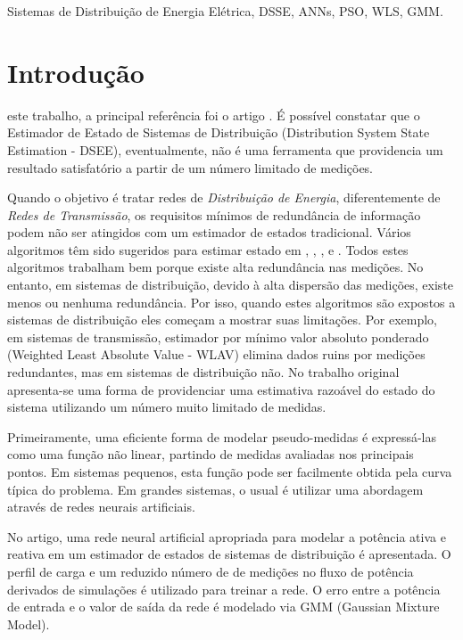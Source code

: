 \documentclass{IEEEtran}
\begin{document}
\begin{IEEEkeywords}
Sistemas de Distribuição de Energia Elétrica, DSSE, ANNs, PSO, WLS, GMM.
\end{IEEEkeywords}

\IEEEpeerreviewmaketitle

\section{Introdução}
 este trabalho, a principal referência foi o artigo \cite{manitsas2012distribution}. É possível constatar que o Estimador de Estado de Sistemas de Distribuição (Distribution System State Estimation - DSEE), eventualmente, não é uma ferramenta que providencia um resultado satisfatório a partir de um número limitado de medições. 

Quando o objetivo é tratar redes de \textit{Distribuição de Energia}, diferentemente de \textit{Redes de Transmissão}, os requisitos mínimos de redundância de informação podem não ser atingidos com um estimador de estados tradicional. Vários algoritmos têm sido sugeridos para estimar estado em \cite{schweppe1970powerI}, \cite{schweppe1970powerII}, \cite{schweppe1970powerIII}, \cite{abur2004power} e \cite{monticelli2000electric}. Todos estes algoritmos trabalham bem porque existe alta redundância nas medições. No entanto, em sistemas de distribuição, devido à alta dispersão das medições, existe menos ou nenhuma redundância. Por isso, quando estes algoritmos são expostos a sistemas de distribuição eles começam a mostrar suas limitações. Por exemplo, em sistemas de transmissão, estimador por mínimo valor absoluto ponderado (Weighted Least Absolute Value - WLAV) elimina dados ruins por medições redundantes, mas em sistemas de distribuição não. No trabalho original apresenta-se uma forma de providenciar uma estimativa razoável do estado do sistema utilizando um número muito limitado de medidas.

Primeiramente, uma eficiente forma de modelar pseudo-medidas é expressá-las como uma função não linear, partindo de medidas avaliadas nos principais pontos. Em sistemas pequenos, esta função pode  ser facilmente obtida pela curva típica do problema. Em grandes sistemas, o usual é utilizar uma abordagem através de redes neurais artificiais.

No artigo, uma rede neural artificial apropriada para modelar a potência ativa e reativa em um estimador de estados de sistemas de distribuição é apresentada. O perfil de carga e um reduzido número de de medições no fluxo de potência derivados de simulações é utilizado para treinar a rede. O erro entre a potência de entrada e o valor de saída da rede é modelado via GMM (Gaussian Mixture Model).
\end{document}
